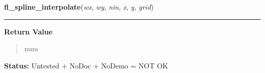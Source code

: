     \label{xformslib:flxyplot:fl_spline_interpolate}

    \vspace{0.5ex}

\hspace{.8\funcindent}\begin{boxedminipage}{\funcwidth}

    \raggedright \textbf{fl\_spline\_interpolate}(\textit{wx}, \textit{wy}, \textit{nin}, \textit{x}, \textit{y}, \textit{grid})

    \vspace{-1.5ex}

    \rule{\textwidth}{0.5\fboxrule}
\setlength{\parskip}{2ex}
\setlength{\parskip}{1ex}
      \textbf{Return Value}
    \vspace{-1ex}

      \begin{quote}
      num

      \end{quote}

\textbf{Status:} Untested + NoDoc + NoDemo = NOT OK



    \end{boxedminipage}

    \label{xformslib:flxyplot:fl_set_xyplot_symbol}

    \vspace{0.5ex}

